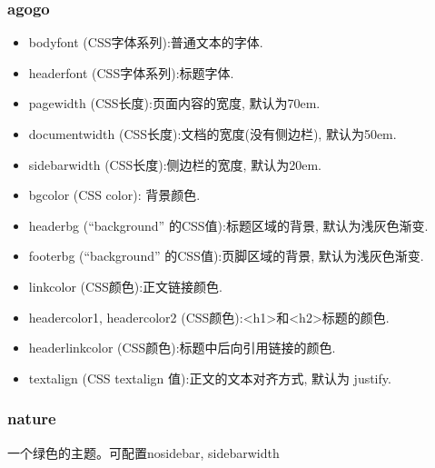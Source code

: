 \documentclass[a4paper,10pt,english]{sphinxmanual}
\begin{document}
\subsubsection{agogo}
\label{\detokenize{sphinx_conf:agogo}}\begin{itemize}
\item {} 
\sphinxAtStartPar
bodyfont (CSS字体系列):普通文本的字体.

\item {} 
\sphinxAtStartPar
headerfont (CSS字体系列):标题字体.

\item {} 
\sphinxAtStartPar
pagewidth (CSS长度):页面内容的宽度, 默认为70em.

\item {} 
\sphinxAtStartPar
documentwidth (CSS长度):文档的宽度(没有侧边栏), 默认为50em.

\item {} 
\sphinxAtStartPar
sidebarwidth (CSS长度):侧边栏的宽度, 默认为20em.

\item {} 
\sphinxAtStartPar
bgcolor (CSS color): 背景颜色.

\item {} 
\sphinxAtStartPar
headerbg (“background” 的CSS值):标题区域的背景, 默认为浅灰色渐变.

\item {} 
\sphinxAtStartPar
footerbg (“background” 的CSS值):页脚区域的背景, 默认为浅灰色渐变.

\item {} 
\sphinxAtStartPar
linkcolor (CSS颜色):正文链接颜色.

\item {} 
\sphinxAtStartPar
headercolor1, headercolor2 (CSS颜色):<h1>和<h2>标题的颜色.

\item {} 
\sphinxAtStartPar
headerlinkcolor (CSS颜色):标题中后向引用链接的颜色.

\item {} 
\sphinxAtStartPar
textalign (CSS text\sphinxhyphen{}align 值):正文的文本对齐方式, 默认为 justify.

\end{itemize}


\subsubsection{nature}
\label{\detokenize{sphinx_conf:nature}}
\sphinxAtStartPar
一个绿色的主题。可配置nosidebar, sidebarwidth
\end{document}
